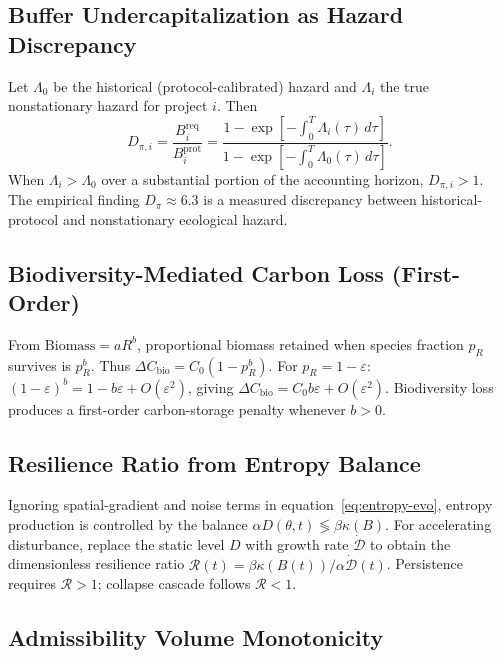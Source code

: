 \documentclass[12pt]{article}
\begin{document}
\subsection{Buffer Undercapitalization as Hazard Discrepancy}

Let $\Lambda_0$ be the historical (protocol-calibrated) hazard and $\Lambda_i$ the true
nonstationary hazard for project $i$. Then
\begin{equation*}
D_{\pi,i}
=\frac{B_i^{\mathrm{req}}}{B_i^{\mathrm{prot}}}
=\frac{1-\exp[-\int_0^T\Lambda_i(\tau)\,d\tau]}{1-\exp[-\int_0^T\Lambda_0(\tau)\,d\tau]}.
\end{equation*}
When $\Lambda_i > \Lambda_0$ over a substantial portion of the accounting horizon,
$D_{\pi,i}>1$. The empirical finding $D_\pi\approx 6.3$ is a measured discrepancy
between historical-protocol and nonstationary ecological hazard.

\subsection{Biodiversity-Mediated Carbon Loss (First-Order)}

From $\mathrm{Biomass}=aR^b$, proportional biomass retained when species fraction
$p_R$ survives is $p_R^b$. Thus $\Delta C_\text{bio}=C_0(1-p_R^b)$.
For $p_R=1-\varepsilon$:
$(1-\varepsilon)^b = 1-b\varepsilon+O(\varepsilon^2)$,
giving $\Delta C_\text{bio} = C_0 b\varepsilon + O(\varepsilon^2)$.
Biodiversity loss produces a first-order carbon-storage penalty whenever $b>0$.

\subsection{Resilience Ratio from Entropy Balance}

Ignoring spatial-gradient and noise terms in equation~\eqref{eq:entropy-evo},
entropy production is controlled by the balance
$\alpha D(\theta,t) \lessgtr \beta\kappa(B)$.
For accelerating disturbance, replace the static level $D$ with growth rate
$\dot{\mathcal{D}}$ to obtain the dimensionless resilience ratio
$\mathcal{R}(t) = \beta\kappa(B(t))/\alpha\dot{\mathcal{D}}(t)$.
Persistence requires $\mathcal{R}>1$; collapse cascade follows $\mathcal{R}<1$.

\subsection{Admissibility Volume Monotonicity}
\end{document}
